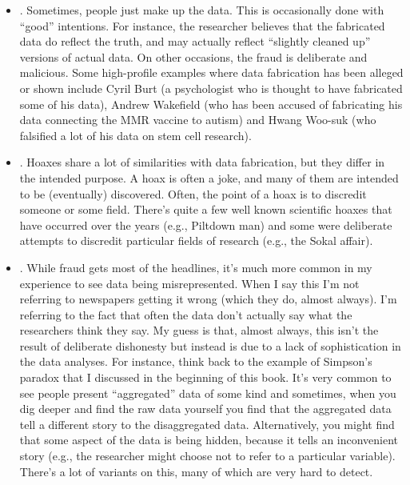 \begin{itemize}
\item {}. Sometimes, people just make up the data. This is occasionally done with ``good'' intentions. For instance, the researcher believes that the fabricated data do reflect the truth, and may actually reflect ``slightly cleaned up'' versions of actual data. On other occasions, the fraud is deliberate and malicious. Some high-profile examples where data fabrication has been alleged or shown include Cyril Burt (a psychologist who is thought to have fabricated some of his data), Andrew Wakefield (who has been accused of fabricating his data connecting the MMR vaccine to autism) and Hwang Woo-suk (who falsified a lot of his data on stem cell research).  
\item {}. Hoaxes share a lot of similarities with data fabrication, but they differ in the intended purpose. A hoax is often a joke, and many of them are intended to be (eventually) discovered. Often, the point of a hoax is to discredit someone or some field. There's quite a few well known scientific hoaxes that have occurred over the years (e.g., Piltdown man) and some were deliberate attempts to discredit particular fields of research (e.g., the Sokal affair). 
\item {}. While fraud gets most of the headlines, it's much more common in my experience to see data being misrepresented. When I say this I'm not referring to newspapers getting it wrong (which they do, almost always). I'm referring to the fact that often the data don't actually say what the researchers think they say. My guess is that, almost always, this isn't the result of deliberate dishonesty but instead is due to a lack of sophistication in the data analyses. For instance, think back to the example of Simpson's paradox that I discussed in the beginning of this book. It's very common to see people present ``aggregated'' data of some kind and sometimes, when you dig deeper and find the raw data yourself you find that the aggregated data tell a different story to the disaggregated data. Alternatively, you might find that some aspect of the data is being hidden, because it tells an inconvenient story (e.g., the researcher might choose not to refer to a particular variable). There's a lot of variants on this, many of which are very hard to detect.

\end{itemize}

